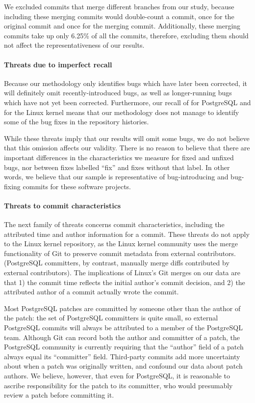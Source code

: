 We excluded commits that merge different branches from our study, because
including these merging commits would double-count a commit, once for the
original commit and once for the merging commit.  Additionally, these merging
commits take up only 6.25\% of all the commits, therefore, excluding them should
not affect the representativeness of our results.

\paragraph{Threats due to imperfect recall}

Because our methodology only identifies bugs which have later been corrected, it
will definitely omit recently-introduced bugs, as well as longer-running bugs
which have not yet been corrected. Furthermore, our recall of \postR for
PostgreSQL and \linuxR for the Linux kernel means that our methodology does not
manage to identify some of the bug fixes in the repository histories.

While these threats imply that our results will omit some bugs, we do not
believe that this omission affects our validity. There is no reason to believe
that there are important differences in the characteristics we measure for fixed
and unfixed bugs, nor between fixes labelled ``fix'' and fixes without that
label. In other words, we believe that our sample is representative of
bug-introducing and bug-fixing commits for these software projects.

\paragraph{Threats to commit characteristics}

The next family of threats concerns commit characteristics, including the
attributed time and author information for a commit.  These threats do not apply
to the Linux kernel repository, as the Linux kernel community uses the merge
functionality of Git to preserve commit metadata from external
contributors. (PostgreSQL committers, by contrast, manually merge diffs
contributed by external contributors).  The implications of Linux's Git merges
on our data are that 1) the commit time reflects the initial author's commit
decision, and 2) the attributed author of a commit actually wrote the commit.

Most PostgreSQL patches are committed by someone other than the author of the
patch: the set of PostgreSQL committers is quite small, so external PostgreSQL
commits will always be attributed to a member of the PostgreSQL team. Although
Git can record both the author and committer of a patch, the PostgreSQL
community is currently requiring that the ``author'' field of a patch always
equal its ``committer'' field.  Third-party commits add more uncertainty about
when a patch was originally written, and confound our data about patch authors.
We believe, however, that even for PostgreSQL, it is reasonable to ascribe
responsibility for the patch to its committer, who would presumably review a
patch before committing it.

